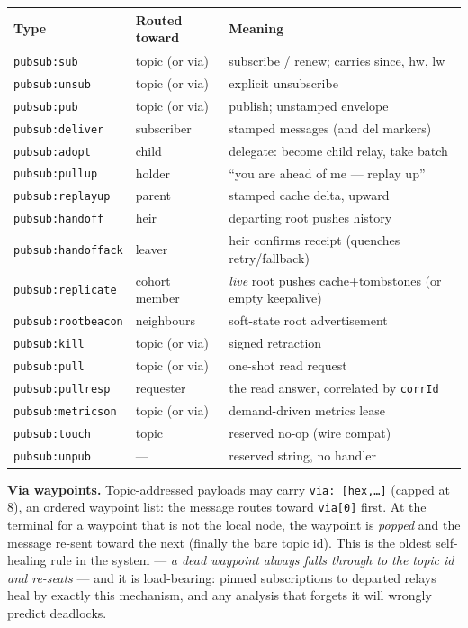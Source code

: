 \documentclass[nobib]{tufte-handout}
\begin{document}
\begin{table}[h]
\scriptsize
\begin{tabular}{@{}lll@{}}
\toprule
Type & Routed toward & Meaning \\
\midrule
\texttt{pubsub:sub} & topic (or via) & subscribe / renew; carries since, hw, lw \\
\texttt{pubsub:unsub} & topic (or via) & explicit unsubscribe \\
\texttt{pubsub:pub} & topic (or via) & publish; unstamped envelope \\
\texttt{pubsub:deliver} & subscriber & stamped messages (and del markers) \\
\texttt{pubsub:adopt} & child & delegate: become child relay, take batch \\
\texttt{pubsub:pullup} & holder & ``you are ahead of me --- replay up'' \\
\texttt{pubsub:replayup} & parent & stamped cache delta, upward \\
\texttt{pubsub:handoff} & heir & departing root pushes history \\
\texttt{pubsub:handoffack} & leaver & heir confirms receipt (quenches retry/fallback) \\
\texttt{pubsub:replicate} & cohort member & \emph{live} root pushes cache+tombstones (or empty keepalive) \\
\texttt{pubsub:rootbeacon} & neighbours & soft-state root advertisement \\
\texttt{pubsub:kill} & topic (or via) & signed retraction \\
\texttt{pubsub:pull} & topic (or via) & one-shot read request \\
\texttt{pubsub:pullresp} & requester & the read answer, correlated by \texttt{corrId} \\
\texttt{pubsub:metricson} & topic (or via) & demand-driven metrics lease \\
\texttt{pubsub:touch} & topic & reserved no-op (wire compat) \\
\texttt{pubsub:unpub} & --- & reserved string, no handler \\
\bottomrule
\end{tabular}
\end{table}

\textbf{Via waypoints.} Topic-addressed payloads may carry
\texttt{via:\,[hex,\ldots]} (capped at 8), an ordered waypoint list: the
message routes toward \texttt{via[0]} first. At the terminal for a
waypoint that is not the local node, the waypoint is \emph{popped} and
the message re-sent toward the next (finally the bare topic id). This is
the oldest self-healing rule in the system --- \emph{a dead waypoint
always falls through to the topic id and re-seats} --- and it is
load-bearing: pinned subscriptions to departed relays heal by exactly
this mechanism, and any analysis that forgets it will wrongly predict
deadlocks.
\end{document}
